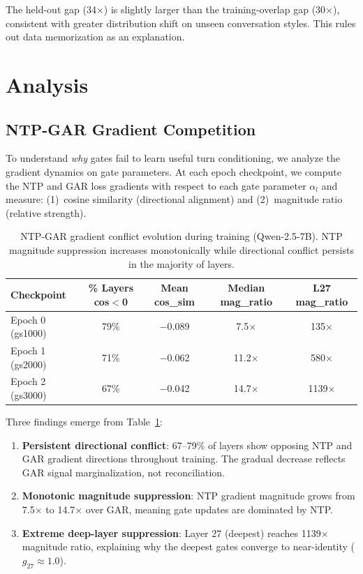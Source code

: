 \documentclass[11pt,a4paper]{article}
\begin{document}
The held-out gap (34$\times$) is slightly larger than the training-overlap gap (30$\times$), consistent with greater distribution shift on unseen conversation styles.
This rules out data memorization as an explanation.

\section{Analysis}

\subsection{NTP-GAR Gradient Competition}

To understand \emph{why} gates fail to learn useful turn conditioning, we analyze the gradient dynamics on gate parameters.
At each epoch checkpoint, we compute the NTP and GAR loss gradients with respect to each gate parameter $\alpha_l$ and measure: (1)~cosine similarity (directional alignment) and (2)~magnitude ratio (relative strength).

\begin{table}[h]
\centering
\caption{NTP-GAR gradient conflict evolution during training (Qwen-2.5-7B). NTP magnitude suppression increases monotonically while directional conflict persists in the majority of layers.}
\label{tab:grad-qwen}
\begin{tabular}{lcccc}
\toprule
\textbf{Checkpoint} & \textbf{\% Layers cos$<$0} & \textbf{Mean cos\_sim} & \textbf{Median mag\_ratio} & \textbf{L27 mag\_ratio} \\
\midrule
Epoch 0 (gs1000) & 79\% & $-$0.089 & 7.5$\times$  & 135$\times$ \\
Epoch 1 (gs2000) & 71\% & $-$0.062 & 11.2$\times$ & 580$\times$ \\
Epoch 2 (gs3000) & 67\% & $-$0.042 & 14.7$\times$ & 1139$\times$ \\
\bottomrule
\end{tabular}
\end{table}

Three findings emerge from Table~\ref{tab:grad-qwen}:
\begin{enumerate}
    \item \textbf{Persistent directional conflict}: 67--79\% of layers show opposing NTP and GAR gradient directions throughout training. The gradual decrease reflects GAR signal marginalization, not reconciliation.
    \item \textbf{Monotonic magnitude suppression}: NTP gradient magnitude grows from 7.5$\times$ to 14.7$\times$ over GAR, meaning gate updates are dominated by NTP.
    \item \textbf{Extreme deep-layer suppression}: Layer 27 (deepest) reaches 1139$\times$ magnitude ratio, explaining why the deepest gates converge to near-identity ($g_{27} \approx 1.0$).
\end{enumerate}
\end{document}
